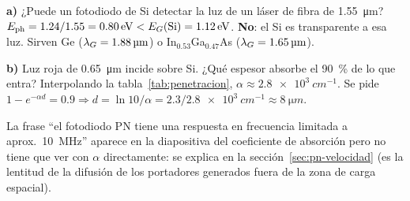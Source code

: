 \begin{ejemplo}
\textbf{a)} ¿Puede un fotodiodo de Si detectar la luz de un láser de fibra de
\SI{1.55}{\micro m}? \quad
$\Eph = 1.24/1.55 = \SI{0.80}{\eV} < \EG(\text{Si}) = \SI{1.12}{\eV}$. \textbf{No}: el Si
es transparente a esa luz. Sirven Ge ($\lambda_G=\SI{1.88}{\micro m}$) o
In$_{0.53}$Ga$_{0.47}$As ($\lambda_G=\SI{1.65}{\micro m}$).

\textbf{b)} Luz roja de \SI{0.65}{\micro m} incide sobre Si. ¿Qué espesor absorbe el
\SI{90}{\percent} de lo que entra? \quad Interpolando la tabla~\ref{tab:penetracion},
$\alpha\approx\SI{2.8e3}{cm^{-1}}$. Se pide $1-e^{-\alpha d}=0.9\Rightarrow
d=\ln 10/\alpha = 2.3/\SI{2.8e3}{cm^{-1}}\approx\SI{8}{\micro m}$.
\end{ejemplo}

\begin{ojo}[\diapo{5}]
La frase ``el fotodiodo PN tiene una respuesta en frecuencia limitada a aprox.\
\SI{10}{MHz}'' aparece en la diapositiva del coeficiente de absorción pero no tiene que ver
con $\alpha$ directamente: se explica en la sección~\ref{sec:pn-velocidad} (es la lentitud
de la difusión de los portadores generados fuera de la zona de carga espacial).
\end{ojo}
